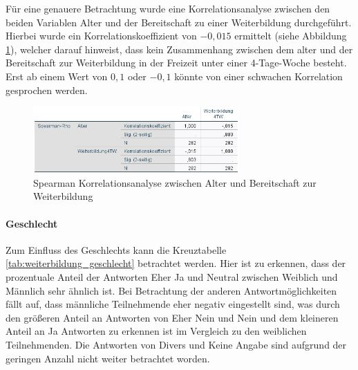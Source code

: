 Für eine genauere Betrachtung wurde eine Korrelationsanalyse zwischen den beiden Variablen Alter 
und der Bereitschaft zu einer Weiterbildung durchgeführt. Hierbei wurde ein Korrelationskoeffizient 
von $-0,015$ ermittelt (siehe Abbildung \ref{fig:korrelation_bereitschaft_alter}),
welcher darauf hinweist, dass kein Zusammenhang zwischen dem 
alter und der Bereitschaft zur Weiterbildung in der Freizeit unter einer 4-Tage-Woche besteht.
Erst ab einem Wert von $0,1$ oder $-0,1$ könnte von einer schwachen Korrelation gesprochen werden.

\begin{figure}[h]
    \centering
    \includegraphics[width=0.7\textwidth]{04_Artefakte/01_Abbildungen/hypothese_9/korrelation_bereitschaft_alter.png}
    \caption{Spearman Korrelationsanalyse zwischen Alter und Bereitschaft zur Weiterbildung}
    \label{fig:korrelation_bereitschaft_alter}
  \end{figure}


\paragraph*{Geschlecht}

Zum Einfluss des Geschlechts kann die Kreuztabelle \ref{tab:weiterbildung_geschlecht} betrachtet werden.
Hier ist zu erkennen, dass der prozentuale Anteil der Antworten Eher Ja und Neutral zwischen Weiblich und Männlich sehr ähnlich ist. 
Bei Betrachtung der anderen Antwortmöglichkeiten fällt auf, dass männliche Teilnehmende eher negativ eingestellt sind, was durch
den größeren Anteil an Antworten von Eher Nein und Nein und dem kleineren Anteil an Ja Antworten
zu erkennen ist im Vergleich zu den weiblichen Teilnehmenden. Die Antworten von Divers und Keine Angabe sind 
aufgrund der geringen Anzahl nicht weiter betrachtet worden.


